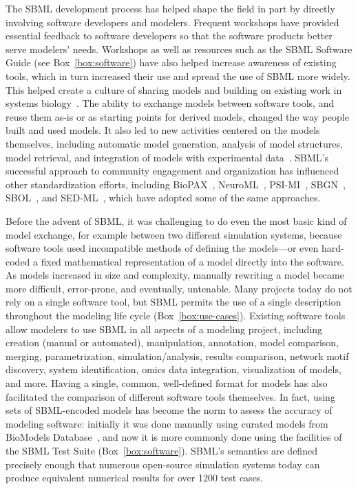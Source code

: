 \documentclass[]{draft-sbml-paper}
\begin{document}
The SBML development process has helped shape the field in part by directly involving software developers and modelers.  Frequent workshops have provided essential feedback to software developers so that the software products better serve modelers' needs.  Workshops as well as resources such as the SBML Software Guide (see Box~\ref{box:software}) have also helped increase awareness of existing tools, which in turn increased their use and spread the use of SBML more widely.  This helped create a culture of sharing models and building on existing work in systems biology~\citep{stanford2015evolution}.  The ability to exchange models between software tools, and reuse them as-is or as starting points for derived models, changed the way people built and used models.  It also led to new activities centered on the models themselves, including automatic model generation, analysis of model structures, model retrieval, and integration of models with experimental data~\citep{Draeger2014}.  SBML's successful approach to community engagement and organization has influenced other standardization efforts, including BioPAX~\citep{Demir2010}, NeuroML~\citep{Gleeson2010}, PSI-MI~\citep{hermjakob2004the}, SBGN~\citep{VanIersel2012}, SBOL~\citep{Roehner2016}, and SED-ML~\citep{waltemath2011reproducible, Kohn2008sedml}, which have adopted some of the same approaches.

Before the advent of SBML, it was challenging to do even the most basic kind of model exchange, for example between two different simulation systems, because software tools used incompatible methods of defining the models---or even hard-coded a fixed mathematical representation of a model directly into the software.  As models increased in size and complexity, manually rewriting a model became more difficult, error-prone, and eventually, untenable.  Many projects today do not rely on a single software tool, but SBML permits the use of a single description throughout the modeling life cycle (Box~\ref{box:use-cases}).  Existing software tools allow modelers to use SBML in all aspects of a modeling project, including creation (manual or automated), manipulation, annotation, model comparison, merging, parametrization, simulation/analysis, results comparison, network motif discovery, system identification, omics data integration, visualization of models, and more.  Having a single, common, well-defined format for models has also facilitated the comparison of different software tools themselves.  In fact, using sets of SBML-encoded models has become the norm to assess the accuracy of modeling software: initially it was done manually using curated models from BioModels Database~\citep{bergmann2008comparing}, and now it is more commonly done using the facilities of the SBML Test Suite (Box~\ref{box:software}).  SBML's semantics are defined precisely enough that numerous open-source simulation systems today can produce equivalent numerical results for over 1200 test cases.
\end{document}
